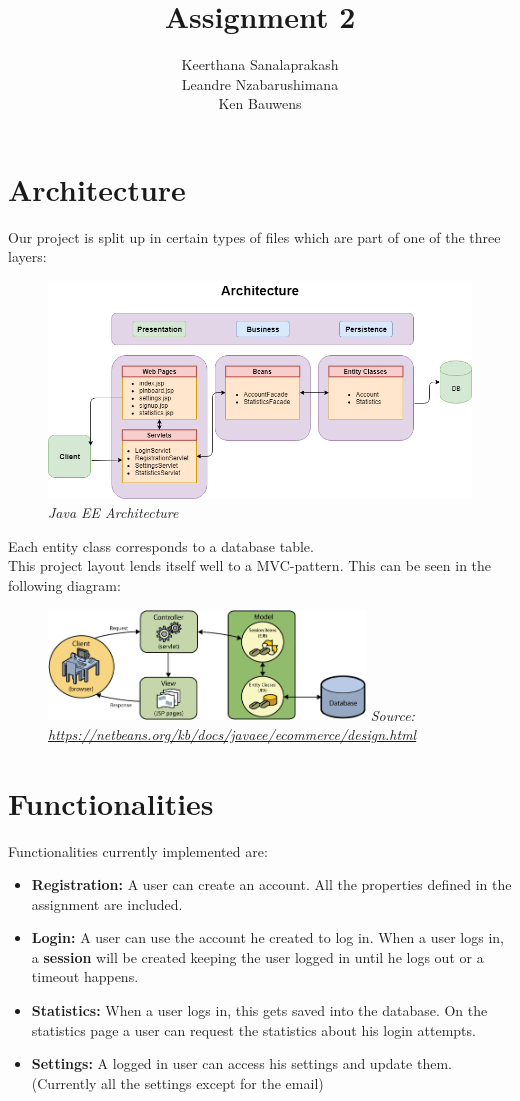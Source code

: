 \documentclass{article}
\title{Assignment 2}
\author{Keerthana Sanalaprakash \\ Leandre Nzabarushimana \\ Ken Bauwens}
\date{}
\begin{document}
\maketitle
\section{Architecture}
Our project is split up in certain types of files which are part of one of the three layers:
\begin{figure}[h]
\centering
\includegraphics[width=1\textwidth]{Architecture.png}
\small\textit{Java EE Architecture}
\end{figure}
Each entity class corresponds to a database table.
\\This project layout lends itself well to a MVC-pattern. This can be seen in the following diagram:
\begin{figure}[h]
\centering
\includegraphics[width=0.75\textwidth]{mvc-diagram.png}
\small\textit{Source:\url{ https://netbeans.org/kb/docs/javaee/ecommerce/design.html}}
\end{figure}
\pagebreak
\section{Functionalities}
Functionalities currently implemented are:

\begin{itemize}
\item \textbf{Registration:} A user can create an account. All the properties defined in the assignment are included.
\item \textbf{Login:} A user can use the account he created to log in. When a user logs in, a \textbf{session} will be created keeping the user logged in until he logs out or a timeout happens.
\item \textbf{Statistics:} When a user logs in, this gets saved into the database. On the statistics page a user can request the statistics about his login attempts.
\item \textbf{Settings:} A logged in user can access his settings and update them. (Currently all the settings except for the email)
\end{itemize}
\end{document}

